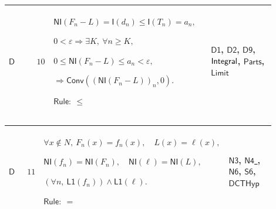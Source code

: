 \documentclass[12pt,reqno]{amsart}
\theoremstyle{blueplain}
\numberwithin{equation}{section}
\begin{document}
{\scriptsize \setlength{\parskip}{0pt}\nointerlineskip
\noindent 
\begin{tabular}{|@{}>{\centering\arraybackslash}m{0.10658\linewidth}|>{\centering\arraybackslash}m{0.03553\linewidth}|>{\centering\arraybackslash}m{0.52105\linewidth}|>{\centering\arraybackslash}m{0.23684\linewidth}|}
\hline
\hypertarget{dct:D10}{$\displaystyle \mathsf{D}$} & $\displaystyle 10$ & $%
\displaystyle \mathsf{NI}(F_n-L)=\mathsf{I}(d_n)\le\mathsf{I}(T_n)=a_n,$\par$%
\displaystyle 0<\varepsilon\Rightarrow\exists K,\ \forall n\ge K,$\par$%
\displaystyle 0\le\mathsf{NI}(F_n-L)\le a_n<\varepsilon,$\par$\displaystyle %
\Rightarrow\mathsf{Conv}((\mathsf{NI}(F_n-L))_n,0).$\par$\displaystyle 
\mathsf{Rule}:\ \le$ & \hyperlink{dct:D1}{$\displaystyle \mathsf{D1}$}, 
\hyperlink{dct:D2}{$\displaystyle \mathsf{D2}$}, \hyperlink{dct:D9}{$%
\displaystyle \mathsf{D9}$}, \hyperlink{lem:Integral}{$\displaystyle \mathsf{%
Integral}$}, \hyperlink{dctdef:Parts}{$\displaystyle \mathsf{Parts}$}, 
\hyperlink{def:Limit}{$\displaystyle \mathsf{Limit}$} \\ \hline
\end{tabular}%
}

{\scriptsize \setlength{\parskip}{0pt}\nointerlineskip
\noindent 
\begin{tabular}{|@{}>{\centering\arraybackslash}m{0.10658\linewidth}|>{\centering\arraybackslash}m{0.03553\linewidth}|>{\centering\arraybackslash}m{0.52105\linewidth}|>{\centering\arraybackslash}m{0.23684\linewidth}|}
\hline
\hypertarget{dct:D11}{$\displaystyle \mathsf{D}$} & $\displaystyle 11$ & $%
\displaystyle \forall x\notin N,\ F_n(x)=f_n(x),\quad L(x)=\ell(x),$\par$%
\displaystyle \mathsf{NI}(f_n)=\mathsf{NI}(F_n),\quad\mathsf{NI}(\ell)=%
\mathsf{NI}(L),$\par$\displaystyle (\forall n,\ \mathsf{L1}(f_n))\land%
\mathsf{L1}(\ell).$\par$\displaystyle \mathsf{Rule}:\ =$ & \hyperlink{dct:N3}%
{$\displaystyle \mathsf{N3}$}, \hyperlink{dct:N4}{$\displaystyle \mathsf{N4}$%
}, \hyperlink{dct:N6}{$\displaystyle \mathsf{N6}$}, \hyperlink{dct:S6}{$%
\displaystyle \mathsf{S6}$}, \hyperlink{dctdef:DCTHyp}{$\displaystyle 
\mathsf{DCTHyp}$} \\ \hline
\end{tabular}%
}
\end{document}
